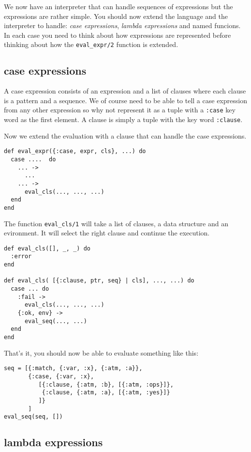 \documentclass[a4paper,11pt]{article}
\begin{document}
We now have an interpreter that can handle sequences of expressions
but the expressions are rather simple. You should now extend the
language and the interpreter to handle: {\em case expressions}, {\em
  lambda expressions} and named funcions. In each case you need to
think about how expressions are represented before thinking about how
the {\tt eval_expr/2} function is extended.

\subsection{case expressions}

A case expression consists of an expression and a list of clauses
where each clause is a pattern and a sequence. We of course need to be
able to tell a case expression from any other expression so why not
represent it as a tuple with a {\tt :case} key word as the first
element. A clause is simply a tuple with the key word {\tt :clause}.

Now we extend the evaluation with a clause that can handle the case
expressions.

\begin{verbatim}
def eval_expr({:case, expr, cls}, ...) do
  case ....  do
    ... ->
      ...
    ... ->
      eval_cls(..., ..., ...)
  end
end
\end{verbatim}

The function {\tt eval_cls/1} will take a list of
clauses, a data structure and an evironment. It will select the right
clause and continue the execution.

\begin{verbatim}
def eval_cls([], _, _) do
  :error
end

def eval_cls( [{:clause, ptr, seq} | cls], ..., ...) do
  case ... do
    :fail ->
      eval_cls(..., ..., ...)
    {:ok, env} ->
      eval_seq(..., ...)
  end
end
\end{verbatim}

That's it, you should now be able to evaluate something like this:

\begin{verbatim}
seq = [{:match, {:var, :x}, {:atm, :a}},
       {:case, {:var, :x},
          [{:clause, {:atm, :b}, [{:atm, :ops}]},
           {:clause, {:atm, :a}, [{:atm, :yes}]}
          ]}
       ]
eval_seq(seq, [])
\end{verbatim}

\subsection{lambda expressions}
\end{document}
